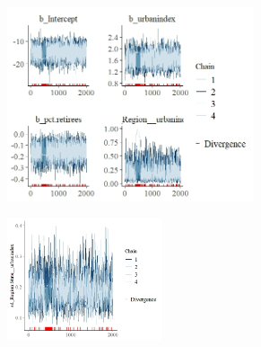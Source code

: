 \documentclass[12pt]{article}
\begin{document}
%
%
%
%


\begin{figure}
	\centering
	\caption{Trace plots for Model 3, all parameters; 2000 sampling iterations}
	\label{fig:trace_mod3_append}
	\begin{subfigure}{\textwidth}
		\centering
		\includegraphics[width=0.8\textwidth]{trace_plots/trace_model3_part1.jpeg}
	\end{subfigure}
	
	\vspace{0.5em} %
	
	\begin{subfigure}{\textwidth}
		\centering
		\includegraphics[width=0.5\textwidth]{trace_plots/trace_model3_part2}
	\end{subfigure}
	
\end{figure}




%
%
%
%
%
%
\end{document}
